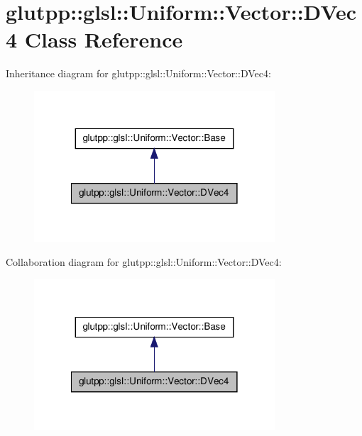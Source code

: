\hypertarget{classglutpp_1_1glsl_1_1Uniform_1_1Vector_1_1DVec4}{\section{glutpp\-:\-:glsl\-:\-:\-Uniform\-:\-:\-Vector\-:\-:\-D\-Vec4 \-Class \-Reference}
\label{classglutpp_1_1glsl_1_1Uniform_1_1Vector_1_1DVec4}
}


\-Inheritance diagram for glutpp\-:\-:glsl\-:\-:\-Uniform\-:\-:\-Vector\-:\-:\-D\-Vec4\-:\nopagebreak
\begin{figure}[H]
\begin{center}
\leavevmode
\includegraphics[width=254pt]{classglutpp_1_1glsl_1_1Uniform_1_1Vector_1_1DVec4__inherit__graph}
\end{center}
\end{figure}


\-Collaboration diagram for glutpp\-:\-:glsl\-:\-:\-Uniform\-:\-:\-Vector\-:\-:\-D\-Vec4\-:\nopagebreak
\begin{figure}[H]
\begin{center}
\leavevmode
\includegraphics[width=254pt]{classglutpp_1_1glsl_1_1Uniform_1_1Vector_1_1DVec4__coll__graph}
\end{center}
\end{figure}
